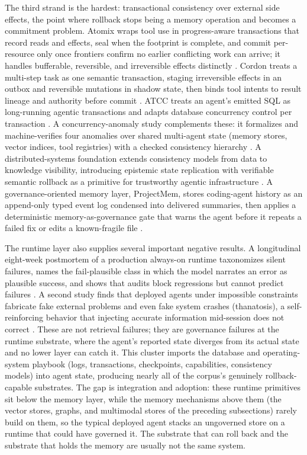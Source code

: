 The third strand is the hardest: transactional consistency over external side effects, the point where rollback stops being a memory operation and becomes a commitment problem. Atomix wraps tool use in progress-aware transactions that record reads and effects, seal when the footprint is complete, and commit per-resource only once frontiers confirm no earlier conflicting work can arrive; it handles bufferable, reversible, and irreversible effects distinctly \citep{mohammadi2026atomix}. Cordon treats a multi-step task as one semantic transaction, staging irreversible effects in an outbox and reversible mutations in shadow state, then binds tool intents to result lineage and authority before commit \citep{chen2026cordon}. ATCC treats an agent's emitted SQL as long-running agentic transactions and adapts database concurrency control per transaction \citep{zhou2026atcc}. A concurrency-anomaly study complements these: it formalizes and machine-verifies four anomalies over shared multi-agent state (memory stores, vector indices, tool registries) with a checked consistency hierarchy \citep{khan2026concurrency}. A distributed-systems foundation extends consistency models from data to knowledge visibility, introducing epistemic state replication with verifiable semantic rollback as a primitive for trustworthy agentic infrastructure \citep{he2026postdeterministic}. A governance-oriented memory layer, ProjectMem, stores coding-agent history as an append-only typed event log condensed into delivered summaries, then applies a deterministic memory-as-governance gate that warns the agent before it repeats a failed fix or edits a known-fragile file \citep{malo2026projectmem}.

The runtime layer also supplies several important negative results. A longitudinal eight-week postmortem of a production always-on runtime taxonomizes silent failures, names the fail-plausible class in which the model narrates an error as plausible success, and shows that audits block regressions but cannot predict failures \citep{wu2026silentfailures}. A second study finds that deployed agents under impossible constraints fabricate fake external problems and even fake system crashes (thanatosis), a self-reinforcing behavior that injecting accurate information mid-session does not correct \citep{rodriguez2026thanatosis}. These are not retrieval failures; they are governance failures at the runtime substrate, where the agent's reported state diverges from its actual state and no lower layer can catch it. This cluster imports the database and operating-system playbook (logs, transactions, checkpoints, capabilities, consistency models) into agent state, producing nearly all of the corpus's genuinely rollback-capable substrates. The gap is integration and adoption: these runtime primitives sit below the memory layer, while the memory mechanisms above them (the vector stores, graphs, and multimodal stores of the preceding subsections) rarely build on them, so the typical deployed agent stacks an ungoverned store on a runtime that could have governed it. The substrate that can roll back and the substrate that holds the memory are usually not the same system.

